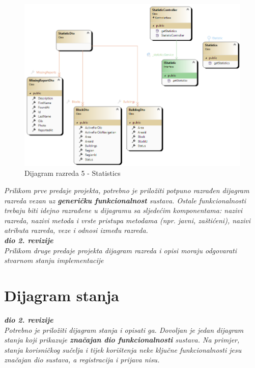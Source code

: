 			\begin{figure}[h!] \includegraphics[width=\linewidth]{dijagrami/CD-Statistics.png}
				\caption{Dijagram razreda 5 - Statistics}
			\end{figure}
			
			\textit{Prilikom prve predaje projekta, potrebno je priložiti potpuno razrađen dijagram razreda vezan uz \textbf{generičku funkcionalnost} sustava. Ostale funkcionalnosti trebaju biti idejno razrađene u dijagramu sa sljedećim komponentama: nazivi razreda, nazivi metoda i vrste pristupa metodama (npr. javni, zaštićeni), nazivi atributa razreda, veze i odnosi između razreda.}\\
			
			\textbf{\textit{dio 2. revizije}}\\			
			
			\textit{Prilikom druge predaje projekta dijagram razreda i opisi moraju odgovarati stvarnom stanju implementacije}
			
			
			
			\eject
		
		\section{Dijagram stanja}
			
			
			\textbf{\textit{dio 2. revizije}}\\
			
			\textit{Potrebno je priložiti dijagram stanja i opisati ga. Dovoljan je jedan dijagram stanja koji prikazuje \textbf{značajan dio funkcionalnosti} sustava. Na primjer, stanja korisničkog sučelja i tijek korištenja neke ključne funkcionalnosti jesu značajan dio sustava, a registracija i prijava nisu. }
			
